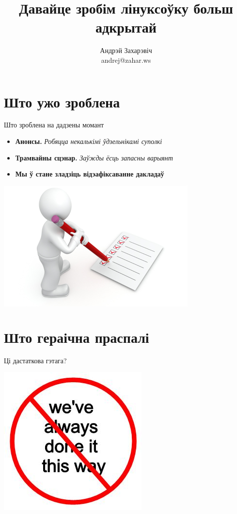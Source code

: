 \documentclass[ignorenonframetext,hyperref={pdftex,unicode}]{beamer}
\title{Давайце зробім лінуксоўку больш адкрытай} %
\author["Андрэй Захарэвіч"]{Андрэй Захарэвіч\\ andrej@zahar.ws} %
\begin{document}

\frame{\titlepage} %


\section{Што ужо зроблена} %

\begin{frame}{Што зроблена на дадзены момант} %
	\begin{itemize}
		\item \textbf{Анонсы.} \emph{Робяцца некалькімі ўдзельнікамі суполкі}
		\item \textbf{Трамвайны сцэнар.} \emph{Заўжды ёсць запасны варыянт}
		\item \textbf{Мы ў стане зладзіць відэафіксаванне дакладаў}
	\end{itemize}
	\begin{center}
 		\includegraphics{what_we've_done} %
	\end{center}
\end{frame} %

\section{Што гераічна праспалі}
\begin{frame}{Ці дастаткова гэтага?} 
	\begin{center}
 		\includegraphics[height=.8\textheight]{Alwaysdoneit} 
	\end{center}
\end{frame} %
\end{document}
